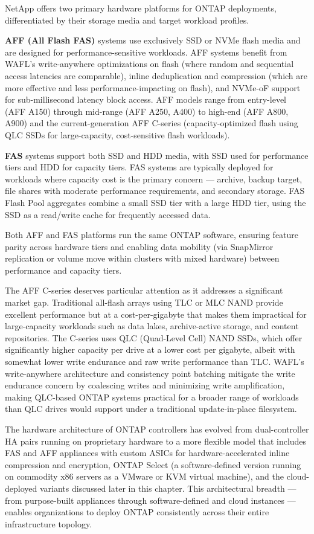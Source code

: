 NetApp offers two primary hardware platforms for ONTAP deployments, differentiated by their storage media and target workload profiles.

\textbf{AFF (All Flash FAS)} systems use exclusively SSD or NVMe flash media and are designed for performance-sensitive workloads. AFF systems benefit from WAFL's write-anywhere optimizations on flash (where random and sequential access latencies are comparable), inline deduplication and compression (which are more effective and less performance-impacting on flash), and NVMe-oF support for sub-millisecond latency block access. AFF models range from entry-level (AFF A150) through mid-range (AFF A250, A400) to high-end (AFF A800, A900) and the current-generation AFF C-series (capacity-optimized flash using QLC SSDs for large-capacity, cost-sensitive flash workloads).

\textbf{FAS} systems support both SSD and HDD media, with SSD used for performance tiers and HDD for capacity tiers. FAS systems are typically deployed for workloads where capacity cost is the primary concern --- archive, backup target, file shares with moderate performance requirements, and secondary storage. FAS Flash Pool aggregates combine a small SSD tier with a large HDD tier, using the SSD as a read/write cache for frequently accessed data.

Both AFF and FAS platforms run the same ONTAP software, ensuring feature parity across hardware tiers and enabling data mobility (via SnapMirror replication or volume move within clusters with mixed hardware) between performance and capacity tiers.

The AFF C-series deserves particular attention as it addresses a significant market gap. Traditional all-flash arrays using TLC or MLC NAND provide excellent performance but at a cost-per-gigabyte that makes them impractical for large-capacity workloads such as data lakes, archive-active storage, and content repositories. The C-series uses QLC (Quad-Level Cell) NAND SSDs, which offer significantly higher capacity per drive at a lower cost per gigabyte, albeit with somewhat lower write endurance and raw write performance than TLC. WAFL's write-anywhere architecture and consistency point batching mitigate the write endurance concern by coalescing writes and minimizing write amplification, making QLC-based ONTAP systems practical for a broader range of workloads than QLC drives would support under a traditional update-in-place filesystem.

The hardware architecture of ONTAP controllers has evolved from dual-controller HA pairs running on proprietary hardware to a more flexible model that includes FAS and AFF appliances with custom ASICs for hardware-accelerated inline compression and encryption, ONTAP Select (a software-defined version running on commodity x86 servers as a VMware or KVM virtual machine), and the cloud-deployed variants discussed later in this chapter. This architectural breadth --- from purpose-built appliances through software-defined and cloud instances --- enables organizations to deploy ONTAP consistently across their entire infrastructure topology.

